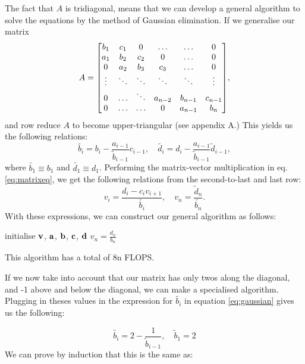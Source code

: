 The fact that $A$ is tridiagonal, means that we can develop a general algorithm
to solve the equations by the method of Gaussian elimination. If we generalise
our matrix
  \[A =
    \mqty[b_1 & c_1 & 0 & \hdots & \hdots & 0 \\
          a_1 & b_2 & c_2 & 0 & \hdots & 0 \\
          0 & a_2 & b_3 & c_3 & \hdots & 0 \\
          \vdots & \ddots & \ddots & \ddots & \ddots & \vdots \\
          0 & \hdots & \ddots & a_{n-2} & b_{n-1} & c_{n-1} \\
          0 & \hdots & \hdots & 0 & a_{n-1} & b_n],
  \]
and row reduce $A$ to become upper-triangular (see appendix A.)
This yields us the following relations:
  \begin{equation}  \label{eq:gaussian}
    \widetilde{b_i} = b_i - \frac{a_{i-1}}{\tilde{b}_{i-1}}c_{i-1}, \quad
    \widetilde{d_i} = d_i - \frac{a_{i-1}}{\tilde{b}_{i-1}}\tilde{d}_{i-1},
  \end{equation}
where $\widetilde{b_1} \equiv b_1$ and $\widetilde{d_1} \equiv d_1$.
Performing the matrix-vector multiplication in eq. \ref{eq:matrixeq}, we get
the following relations from the second-to-last and last row:
  \begin{equation}
    v_i = \frac{d_i - c_iv_{i+1}}{\widetilde{b_i}}, \quad
    v_n = \frac{\widetilde{d}_n}{\widetilde{b_n}}.
  \end{equation}
With these expressions, we can construct our general algorithm as follows:
  \begin{algorithm}[h!]
    \SetAlgoLined
    initialise $\vb{v}$, $\vb{a}$, $\vb{b}$, $\vb{c}$, $\vb{d}$\;
    $v_n = \frac{d_n}{b_n}$\;
  \end{algorithm}

This algorithm has a total of 8n FLOPS.

If we now take into account that our matrix has only twos along the diagonal, and -1 above and below the diagonal, we can make a specialised algorithm. Plugging in theses values in the expression for $\widetilde{b_i}$ in equation \ref{eq:gaussian} gives us the following:

	\begin{equation}
	\widetilde{b_i}=2-\frac{1}{\widetilde{b}_{i-1}}, \quad \widetilde{b}_1=2
	\end{equation}
We can prove by induction that this is the same as:

